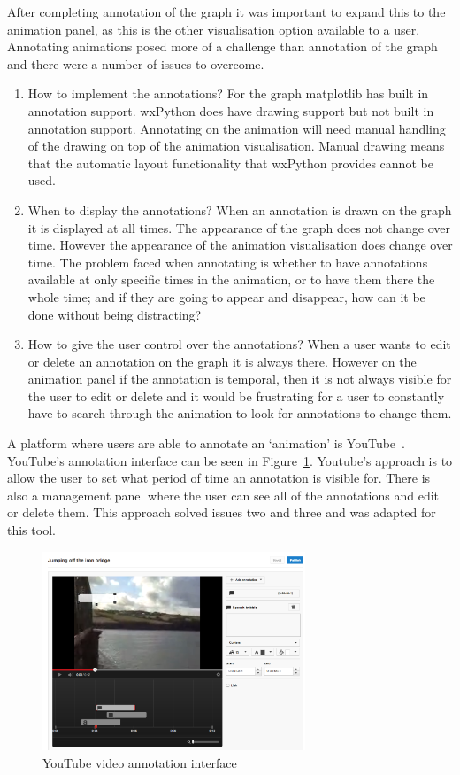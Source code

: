 After completing annotation of the graph it was important to expand this to the animation panel, as this is the other visualisation option available to a user.  Annotating animations posed more of a challenge than annotation of the graph and there were a number of issues to overcome.

\begin{enumerate}
\item How to implement the annotations?  For the graph matplotlib has built in annotation support.  wxPython does have drawing support but not built in annotation support.  Annotating on the animation will need manual handling of the drawing on top of the animation visualisation.  Manual drawing means that the automatic layout functionality that wxPython provides cannot be used.
\item When to display the annotations?  When an annotation is drawn on the graph it is displayed at all times.  The appearance of the graph does not change over time.  However the appearance of the animation visualisation does change over time.  The problem faced when annotating is whether to have annotations available at only specific times in the animation, or to have them there the whole time; and if they are going to appear and disappear, how can it be done without being distracting?
\item How to give the user control over the annotations? When a user wants to edit or delete an annotation on the graph it is always there.  However on the animation panel if the annotation is temporal, then it is not always visible for the user to edit or delete and it would be frustrating for a user to constantly have to search through the animation to look for annotations to change them.
\end{enumerate}

A platform where users are able to annotate an `animation' is YouTube~\cite{youtube}.  YouTube's annotation interface can be seen in Figure~\ref{fig:youtube}.  Youtube's approach is to allow the user to set what period of time an annotation is visible for.  There is also a management panel where the user can see all of the annotations and edit or delete them.  This approach solved issues two and three and was adapted for this tool.

\begin{figure}[h!]
    \centering
    \includegraphics[width=0.7\textwidth]{images/youtube.png}
    \caption{YouTube video annotation interface}
    \label{fig:youtube}
\end{figure}

